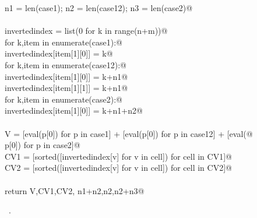 \documentclass[11pt,oneside]{article}	%
\begin{document}
\begin{flushleft}
\begin{list}{}{}
\mbox{}\verb@   n1 = len(case1); n2 = len(case12); n3 = len(case2)@\\
\mbox{}\verb@@\\
\mbox{}\verb@   invertedindex = list(0 for k in range(n+m))@\\
\mbox{}\verb@   for k,item in enumerate(case1):@\\
\mbox{}\verb@      invertedindex[item[1][0]] = k@\\
\mbox{}\verb@   for k,item in enumerate(case12):@\\
\mbox{}\verb@      invertedindex[item[1][0]] = k+n1@\\
\mbox{}\verb@      invertedindex[item[1][1]] = k+n1@\\
\mbox{}\verb@   for k,item in enumerate(case2):@\\
\mbox{}\verb@      invertedindex[item[1][0]] = k+n1+n2@\\
\mbox{}\verb@@\\
\mbox{}\verb@   V = [eval(p[0]) for p in case1] + [eval(p[0]) for p in case12] + [eval(@\\
\mbox{}\verb@            p[0]) for p in case2]@\\
\mbox{}\verb@   CV1 = [sorted([invertedindex[v] for v in cell]) for cell in CV1]@\\
\mbox{}\verb@   CV2 = [sorted([invertedindex[v] for v in cell]) for cell in CV2]@\\
\mbox{}\verb@@\\
\mbox{}\verb@   return V,CV1,CV2, n1+n2,n2,n2+n3@\\
\mbox{}\verb@@{\NWsep}
\end{list}
\vspace{-1ex}
\footnotesize\addtolength{\baselineskip}{-1ex}
\begin{list}{}{\setlength{\itemsep}{-\parsep}\setlength{\itemindent}{-\leftmargin}}
\item \NWtxtMacroRefIn\ .
\end{list}
\end{flushleft}
\end{document}
